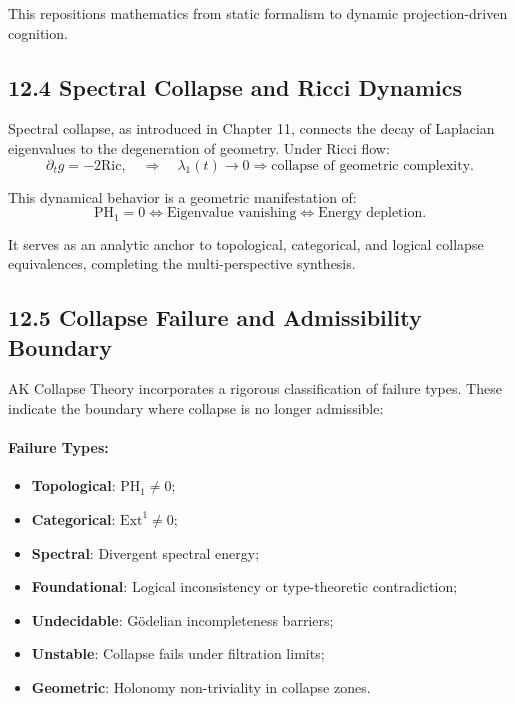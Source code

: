 \documentclass[11pt]{article}
\begin{document}
This repositions mathematics from static formalism to dynamic projection-driven cognition.

\subsection*{12.4 Spectral Collapse and Ricci Dynamics}

Spectral collapse, as introduced in Chapter 11, connects the decay of Laplacian eigenvalues to the degeneration of geometry. Under Ricci flow:
\[
\partial_t g = -2 \mathrm{Ric}, \quad \Rightarrow \quad \lambda_1(t) \to 0 \Rightarrow \text{collapse of geometric complexity}.
\]

This dynamical behavior is a geometric manifestation of:
\[
\mathrm{PH}_1 = 0 \iff \text{Eigenvalue vanishing} \iff \text{Energy depletion}.
\]

It serves as an analytic anchor to topological, categorical, and logical collapse equivalences, completing the multi-perspective synthesis.

\subsection*{12.5 Collapse Failure and Admissibility Boundary}

AK Collapse Theory incorporates a rigorous classification of failure types. These indicate the boundary where collapse is no longer admissible:

\paragraph{Failure Types:}
\begin{itemize}
    \item \textbf{Topological}: \( \mathrm{PH}_1 \neq 0 \);
    \item \textbf{Categorical}: \( \mathrm{Ext}^1 \neq 0 \);
    \item \textbf{Spectral}: Divergent spectral energy;
    \item \textbf{Foundational}: Logical inconsistency or type-theoretic contradiction;
    \item \textbf{Undecidable}: Gödelian incompleteness barriers;
    \item \textbf{Unstable}: Collapse fails under filtration limits;
    \item \textbf{Geometric}: Holonomy non-triviality in collapse zones.
\end{itemize}
\end{document}
